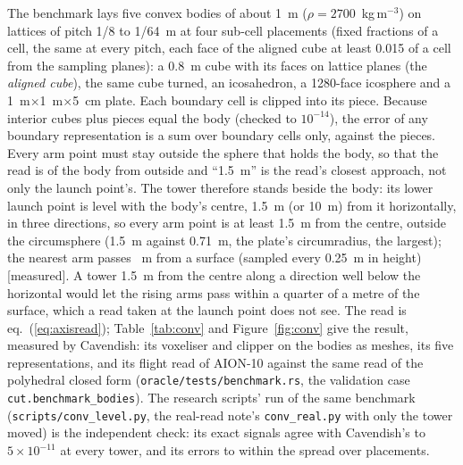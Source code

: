 \documentclass[10pt,a4paper]{article}
\newcommand{\tagM}{\textsf{\small[measured]}}
\begin{document}
The benchmark lays five convex bodies of about 1~m ($\rho = 2700$~kg\,m$^{-3}$) on lattices of pitch
1/8 to 1/64~m at four sub-cell placements (fixed fractions of a cell, the same at every pitch, each
face of the aligned cube at least 0.015 of a cell from the sampling planes): a 0.8~m cube with its faces on lattice planes (the
\emph{aligned cube}), the same cube turned, an icosahedron, a 1280-face icosphere and a
1~m$\times$1~m$\times$5~cm plate. Each boundary cell is clipped into its piece. Because interior cubes
plus pieces equal the body (checked to $10^{-14}$), the error of any boundary representation is a sum
over boundary cells only, against the pieces. Every arm point must stay outside the sphere that holds
the body, so that the read is of the body from outside and ``1.5~m'' is the read's closest approach,
not only the launch point's. The tower therefore stands beside the body: its lower launch point is
level with the body's centre, 1.5~m (or 10~m) from it horizontally, in three directions, so every
arm point is at least 1.5~m from the centre, outside the circumsphere (1.5~m against 0.71~m, the
plate's circumradius, the largest); the nearest arm passes \ArmClearance~m from a surface (sampled
every 0.25~m in height) \tagM. A tower 1.5~m from the centre along a direction well below the
horizontal would let the rising arms pass within a quarter of a metre of the surface, which a read
taken at the launch point does not see. The read is eq.~(\ref{eq:axisread}); Table~\ref{tab:conv} and
Figure~\ref{fig:conv} give the result, measured by Cavendish: its voxeliser and clipper on the
bodies as meshes, its five representations, and its flight read of AION-10 against the same read of
the polyhedral closed form (\texttt{oracle/tests/benchmark.rs}, the validation case
\texttt{cut.benchmark\_bodies}). The research scripts' run of the same benchmark
(\texttt{scripts/conv\_level.py}, the real-read note's \texttt{conv\_real.py} with only the tower
moved) is the independent check: its exact signals agree with Cavendish's to $5\times10^{-11}$ at
every tower, and its errors to within the spread over placements.

\begin{table}[tbp]\centering\scriptsize
\caption{Phase error (rad) at $h=1/64$~m, RMS over four lattice placements of the worst of three
tower directions, with the least-squares order over $h=1/8$ to $1/64$~m in brackets; the spread of
the orders over placements is about $\pm0.3$ \citep[Q2]{paperrealread}. The tower stands beside the
body, its lower launch point level with the centre; static flight-integral read. The signal row gives
the worst direction's flight read with its sign, and the leading read of the same direction in
brackets (the research scripts' read: Cavendish has no leading read). A point mass at the
centroid gives the fill + centroid row to every printed digit (\texttt{scripts/conv\_level.py}).
\tagM, Cavendish (\texttt{oracle/tests/benchmark.rs}).}\label{tab:conv}
\setlength{\tabcolsep}{3pt}
\resizebox{\linewidth}{!}{}
\end{table}
\end{document}
